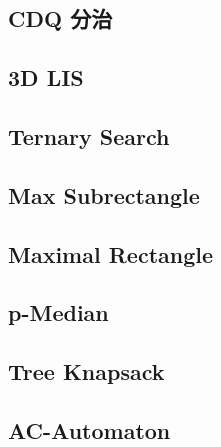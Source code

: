 \documentclass[a4paper,10pt,twocolumn,oneside]{article}
\begin{document}
\subsection{CDQ 分治}


\subsection{3D LIS}


\subsection{Ternary Search}


\subsection{Max Subrectangle}


\subsection{Maximal Rectangle}


\subsection{p-Median}


\subsection{Tree Knapsack}


\subsection{AC-Automaton}
 

% 

%
\end{document}
